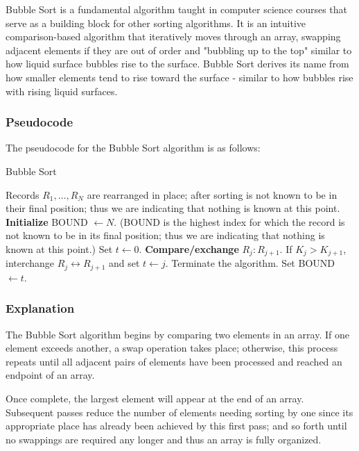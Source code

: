 \documentclass{article}
\begin{document}
Bubble Sort is a fundamental algorithm taught in computer science courses that serve as a building block for other sorting algorithms. It is an intuitive comparison-based algorithm that iteratively moves through an array, swapping adjacent elements if they are out of order and "bubbling up to the top" similar to how liquid surface bubbles rise to the surface. Bubble Sort derives its name from how smaller elements tend to rise toward the surface - similar to how bubbles rise with rising liquid surfaces.

\subsubsection{Pseudocode}

The pseudocode for the Bubble Sort algorithm is as follows:

\begin{algorithm}[H]
\caption{Bubble Sort}
\begin{algorithmic}[1]
\REQUIRE Records $R_1, \ldots, R_N$ are rearranged in place; after sorting is not known to be in their final position; thus we are indicating that nothing is known at this point.
\STATE \textbf{Initialize} BOUND $\gets N$. (BOUND is the highest index for which the record is not known to be in its final position; thus we are indicating that nothing is known at this point.)
    \STATE Set $t \gets 0$.
    \STATE \textbf{Compare/exchange} $R_j: R_{j+1}$. If $K_j > K_{j+1}$, interchange $R_j \leftrightarrow R_{j+1}$ and set $t \gets j$.
        \RETURN Terminate the algorithm.
    \ELSE
        \STATE Set BOUND $\gets t$.
    \ENDIF
\ENDFOR
\end{algorithmic}
\end{algorithm}\cite{karunanithi2014survey}

\subsubsection{Explanation}

The Bubble Sort algorithm begins by comparing two elements in an array. If one element exceeds another, a swap operation takes place; otherwise, this process repeats until all adjacent pairs of elements have been processed and reached an endpoint of an array.

Once complete, the largest element will appear at the end of an array. Subsequent passes reduce the number of elements needing sorting by one since its appropriate place has already been achieved by this first pass; and so forth until no swappings are required any longer and thus an array is fully organized.
\end{document}
